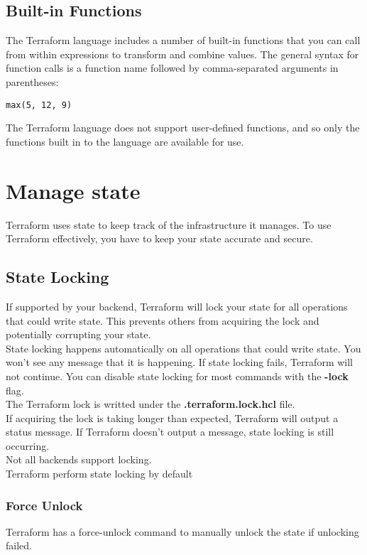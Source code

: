 \documentclass[12pt, letterpaper, twoside]{article}
\begin{document}
\subsection{Built-in Functions}
The Terraform language includes a number of built-in functions that you can call from within expressions to 
transform and combine values. The general syntax for function calls is a function name followed by comma-separated 
arguments in parentheses:
\begin{verbatim}
max(5, 12, 9)
\end{verbatim}

The Terraform language does not support user-defined functions, and so only the functions built in to the language are 
available for use.

\section{Manage state}
Terraform uses state to keep track of the infrastructure it manages. To use Terraform effectively, you have to 
keep your state accurate and secure.

\subsection{State Locking}
If supported by your backend, Terraform will lock your state for all operations that could write state. 
This prevents others from acquiring the lock and potentially corrupting your state.\\
State locking happens automatically on all operations that could write state. You won't see any message that it 
is happening. If state locking fails, Terraform will not continue. 
You can disable state locking for most commands with the \textbf{-lock} flag.\\

The Terraform lock is writted under the \textbf{.terraform.lock.hcl} file.\\

If acquiring the lock is taking longer than expected, Terraform will output a status message. If Terraform doesn't
output a message, state locking is still occurring.\\

Not all backends support locking.\\
Terraform perform state locking by default

\subsubsection{Force Unlock}
Terraform has a force-unlock command to manually unlock the state if unlocking failed.\\
\end{document}
